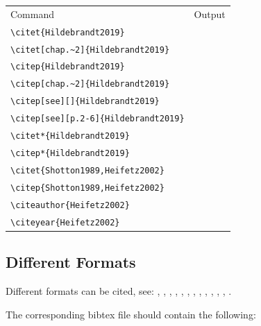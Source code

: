 \documentclass[12pt,final,a4paper,oneside]{book}
\begin{document}
{\footnotesize
\begin{tabular}{ll}
Command & Output \\
\verb|\citet{Hildebrandt2019}| & \citet{Hildebrandt2019} \\
\verb|\citet[chap.~2]{Hildebrandt2019}| & \citet[chap.~2]{Hildebrandt2019} \\
\verb|\citep{Hildebrandt2019}| & \citep{Hildebrandt2019} \\
\verb|\citep[chap.~2]{Hildebrandt2019}| & \citep[chap.~2]{Hildebrandt2019} \\
\verb|\citep[see][]{Hildebrandt2019}| & \citep[see][]{Hildebrandt2019} \\
\verb|\citep[see][p.2-6]{Hildebrandt2019}| & \citep[see][p.2-6]{Hildebrandt2019} \\
\verb|\citet*{Hildebrandt2019}| & \citet*{Hildebrandt2019} \\
\verb|\citep*{Hildebrandt2019}| & \citep*{Hildebrandt2019} \\
\verb|\citet{Shotton1989,Heifetz2002}| & \citet{Shotton1989,Heifetz2002} \\
\verb|\citep{Shotton1989,Heifetz2002}| & \citep{Shotton1989,Heifetz2002} \\
\verb|\citeauthor{Heifetz2002}| & \citeauthor{Heifetz2002} \\
\verb|\citeyear{Heifetz2002}| & \citeyear{Heifetz2002} \\
\end{tabular}
}


	
\subsection{Different Formats}
	
Different formats can be cited, see:	
\citet{unpublished},
\citet{techreport},
\citet{phdthesis},
\citet{misc},
\citet{mastersthesis},
\citet{incollection},
\citet{inbook},
\citet{conference},
\citet{booklet},
\citet{book},
\citet{article},
\citet{proceedings},
\citet{webpage}.

The corresponding bibtex file should contain the following:
\end{document}
